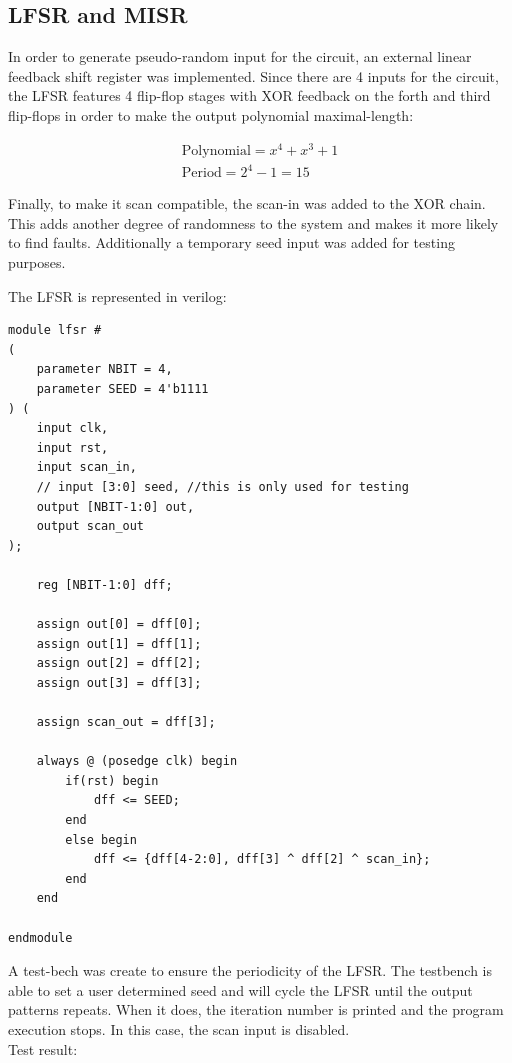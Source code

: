 \documentclass[12pt]{article}
\begin{document}
    \subsection*{LFSR and MISR}
    
    In order to generate pseudo-random input for the circuit, an external linear feedback shift register was implemented. Since there are 4 inputs for the circuit, the LFSR features 4 flip-flop stages with XOR feedback on the forth and third flip-flops in order to make the output polynomial maximal-length:
    
    \begin{equation}
        \begin{matrix}
            \text{Polynomial} = x^{4} + x^{3} + 1 
            \\ 
            \text{Period}= 2^{4} -1 = 15
        \end{matrix}
    \end{equation}
    
    Finally, to make it scan compatible, the scan-in was added to the XOR chain. This adds another degree of randomness to the system and makes it more likely to find faults.
    Additionally a temporary seed input was added for testing purposes.
    
    The LFSR is represented in verilog:
  
    \begin{lstlisting}[caption={Counter variables.},captionpos=b]
module lfsr #
(   
    parameter NBIT = 4,
    parameter SEED = 4'b1111
) (
    input clk,
    input rst,
    input scan_in,
    // input [3:0] seed, //this is only used for testing
    output [NBIT-1:0] out,
    output scan_out
);

    reg [NBIT-1:0] dff;

    assign out[0] = dff[0];
    assign out[1] = dff[1];
    assign out[2] = dff[2];
    assign out[3] = dff[3];
    
    assign scan_out = dff[3];

    always @ (posedge clk) begin
        if(rst) begin
            dff <= SEED;
        end
        else begin
            dff <= {dff[4-2:0], dff[3] ^ dff[2] ^ scan_in};
        end
    end

endmodule
    \end{lstlisting}
    
    A test-bech was create to ensure the periodicity of the LFSR. The testbench is able to set a user determined seed and will cycle the LFSR until the output patterns repeats. When it does, the iteration number is printed and the program execution stops. In this case, the scan input is disabled.\\
    Test result:
        
\end{document}
